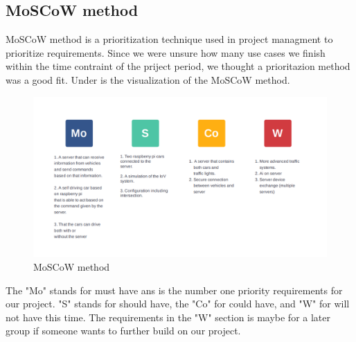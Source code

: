 \subsection{MoSCoW method}


MoSCoW method is a prioritization technique used in project managment to prioritize requirements. Since we were unsure how many use cases we finish within the time contraint of the priject period, we thought a prioritazion method was a good fit.  Under is the visualization of the MoSCoW method.

\begin{figure}[h!]
	\centering
	\includegraphics[width=1\linewidth]{figures/MosCoW_method}
	\caption[MosCoW method]{MoSCoW method}
	\label{fig:moscowmethod}
\end{figure}

The "Mo" stands for must have ans is the number one priority requirements for our project. "S" stands for should have, the "Co" for could have, and "W" for will not have this time. The requirements in the "W" section is maybe for a later group if someone wants to further build on our project.

